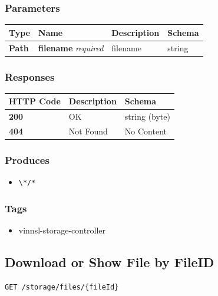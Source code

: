 \subsubsection{Parameters}\label{parameters-14}

\begin{longtable}[]{@{}llll@{}}
\toprule
Type & Name & Description & Schema\tabularnewline
\midrule
\endhead
\textbf{Path} & \textbf{filename} \emph{required} & filename &
string\tabularnewline
\bottomrule
\end{longtable}

\subsubsection{Responses}\label{responses-17}

\begin{longtable}[]{@{}lll@{}}
\toprule
HTTP Code & Description & Schema\tabularnewline
\midrule
\endhead
\textbf{200} & OK & string (byte)\tabularnewline
\textbf{404} & Not Found & No Content\tabularnewline
\bottomrule
\end{longtable}

\subsubsection{Produces}\label{produces-17}

\begin{itemize}
\tightlist
\item
  \texttt{\textbackslash{}*/*}
\end{itemize}

\subsubsection{Tags}\label{tags-17}

\begin{itemize}
\tightlist
\item
  vinnsl-storage-controller
\end{itemize}

\subsection{Download or Show File by
FileID}\label{download-or-show-file-by-fileid}

\begin{verbatim}
GET /storage/files/{fileId}
\end{verbatim}

